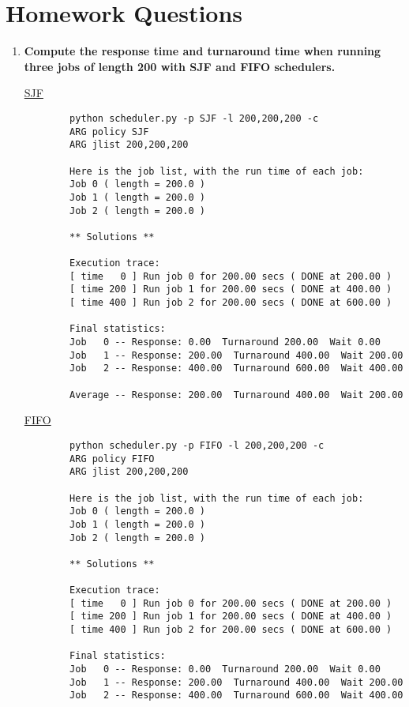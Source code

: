 \documentclass{article}
\begin{document}
\section{Homework Questions}

\begin{enumerate}

    \item \textbf{Compute the response time and turnaround time when running three jobs of length 200 with SJF and FIFO schedulers.}
    
    \underline{SJF}
    \begin{verbatim}
        python scheduler.py -p SJF -l 200,200,200 -c
        ARG policy SJF
        ARG jlist 200,200,200

        Here is the job list, with the run time of each job: 
        Job 0 ( length = 200.0 )
        Job 1 ( length = 200.0 )
        Job 2 ( length = 200.0 )

        ** Solutions **

        Execution trace:
        [ time   0 ] Run job 0 for 200.00 secs ( DONE at 200.00 )
        [ time 200 ] Run job 1 for 200.00 secs ( DONE at 400.00 )
        [ time 400 ] Run job 2 for 200.00 secs ( DONE at 600.00 )

        Final statistics:
        Job   0 -- Response: 0.00  Turnaround 200.00  Wait 0.00
        Job   1 -- Response: 200.00  Turnaround 400.00  Wait 200.00
        Job   2 -- Response: 400.00  Turnaround 600.00  Wait 400.00

        Average -- Response: 200.00  Turnaround 400.00  Wait 200.00
    \end{verbatim}

    \underline{FIFO}
    \begin{verbatim}
        python scheduler.py -p FIFO -l 200,200,200 -c
        ARG policy FIFO
        ARG jlist 200,200,200

        Here is the job list, with the run time of each job: 
        Job 0 ( length = 200.0 )
        Job 1 ( length = 200.0 )
        Job 2 ( length = 200.0 )

        ** Solutions **

        Execution trace:
        [ time   0 ] Run job 0 for 200.00 secs ( DONE at 200.00 )
        [ time 200 ] Run job 1 for 200.00 secs ( DONE at 400.00 )
        [ time 400 ] Run job 2 for 200.00 secs ( DONE at 600.00 )

        Final statistics:
        Job   0 -- Response: 0.00  Turnaround 200.00  Wait 0.00
        Job   1 -- Response: 200.00  Turnaround 400.00  Wait 200.00
        Job   2 -- Response: 400.00  Turnaround 600.00  Wait 400.00


\end{verbatim}
\end{enumerate}
\end{document}

